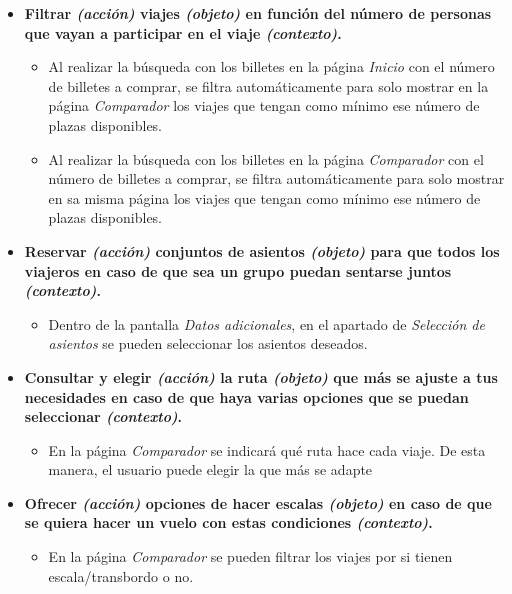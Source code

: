 \begin{itemize}
    \item \textbf{Filtrar \textit{(acción)} viajes \textit{(objeto)} en función del número de personas que vayan a participar en el viaje \textit{(contexto)}.}
        \begin{itemize}
            \item Al realizar la búsqueda con los billetes en la página \textit{Inicio} con el número de billetes a comprar, se filtra automáticamente para solo mostrar
                en la página \textit{Comparador} los viajes que tengan como mínimo ese número de plazas disponibles.
            \item Al realizar la búsqueda con los billetes en la página \textit{Comparador} con el número de billetes a comprar, se filtra automáticamente para solo mostrar
                en sa misma página los viajes que tengan como mínimo ese número de plazas disponibles.
        \end{itemize}

    \item \textbf{Reservar \textit{(acción)} conjuntos de asientos \textit{(objeto)} para que todos los viajeros en caso de que sea un grupo puedan
        sentarse juntos \textit{(contexto)}.}
        \begin{itemize}
            \item Dentro de la pantalla \textit{Datos adicionales}, en el apartado de \textit{Selección de asientos} se pueden seleccionar
                los asientos deseados.
        \end{itemize}

    \item \textbf{Consultar y elegir \textit{(acción)} la ruta \textit{(objeto)} que más se ajuste a tus necesidades en caso de que haya varias opciones que se puedan seleccionar \textit{(contexto)}.}
        \begin{itemize}
            \item En la página \textit{Comparador} se indicará qué ruta hace cada viaje. De esta manera, el usuario puede elegir la que más se adapte
        \end{itemize}

    \item \textbf{Ofrecer \textit{(acción)} opciones de hacer escalas \textit{(objeto)} en caso de que se quiera hacer un vuelo con estas condiciones \textit{(contexto)}.}
        \begin{itemize}
            \item En la página \textit{Comparador} se pueden filtrar los viajes por si tienen escala/transbordo o no.
        \end{itemize}


\end{itemize}
